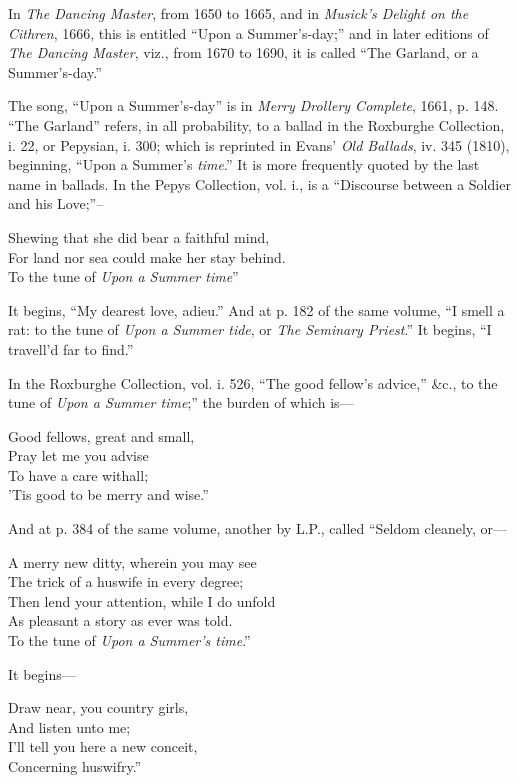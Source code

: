 In \textit{The Dancing Master}, from 1650 to 1665, and in \textit{Musick’s Delight on the
Cithren}, 1666, this is entitled “Upon a Summer’s-day;” and in later editions of
\textit{The Dancing Master}, viz., from 1670 to 1690, it is called “The Garland, or a
Summer’s-day.”

The song, “Upon a Summer’s-day” is in \textit{Merry Drollery Complete}, 1661,
p. 148. “The Garland” refers, in all probability, to a ballad in the Roxburghe
Collection, i. 22, or Pepysian, i. 300; which is reprinted in Evans’ \textit{Old Ballads},
iv. 345 (1810), beginning, “Upon a Summer’s \textit{time}.” It is more frequently
quoted by the last name in ballads. In the Pepys Collection, vol. i., is a
“Discourse between a Soldier and his Love;”--
\settowidth{\versewidth}{For land nor sea could make her stay behind.}
\begin{scverse}Shewing that she did bear a faithful mind,\\
For land nor sea could make her stay behind.\\
\attribution To the tune of \textit{Upon a Summer time}”
\end{scverse}
It begins, “My dearest love, adieu.” And at p. 182 of the same volume,
“I smell a rat: to the tune of \textit{Upon a Summer tide}, or \textit{The Seminary Priest}.”
It begins, “I travell’d far to find.”

In the Roxburghe Collection, vol. i. 526, “The good fellow’s advice,” \&c., to
the tune of \textit{Upon a Summer time};” the burden of which is—
\settowidth{\versewidth}{Good fellows, great and small,}
\begin{scverse}Good fellows, great and small,\\
Pray let me you advise\\
To have a care withall;\\
’Tis good to be merry and wise.”
\end{scverse}
And at p. 384 of the same volume, another by L.P., called “Seldom cleanely, or—
\settowidth{\versewidth}{Then lend your attention, while I do unfold}
\begin{scverse}A merry new ditty, wherein you may see\\
The trick of a huswife in every degree;\\
Then lend your attention, while I do unfold\\
As pleasant a story as ever was told.\\
\attribution To the tune of \textit{Upon a Summer's time}.”
\end{scverse}
It begins—
\settowidth{\versewidth}{I’ll tell you here a new conceit,}
\begin{scverse}
Draw near, you country girls,\\
And listen unto me;\\
I’ll tell you here a new conceit,\\
Concerning huswifry.”
\end{scverse}

